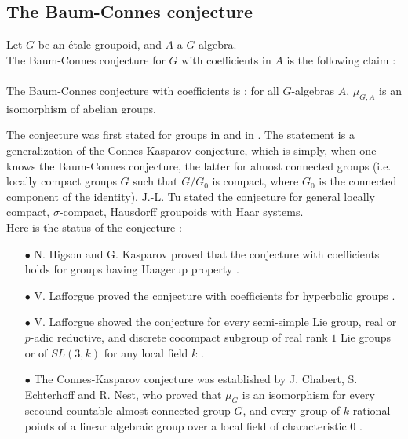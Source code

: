 
\subsection{The Baum-Connes conjecture}

\begin{conj}
Let $G$ be an étale groupoid, and $A$ a $G$-algebra.\\
The Baum-Connes conjecture for $G$ with coefficients in $A$ is the following claim : \\
\\
The Baum-Connes conjecture with coefficients is : for all $G$-algebras $A$, $\mu_{G,A}$ is an isomorphism of abelian groups.
\end{conj}

The conjecture was first stated for groups in \cite{BaumConnes} and in \cite{BaumConnesHigson}. The statement is a generalization of the Connes-Kasparov conjecture, which is simply, when one knows the Baum-Connes conjecture, the latter for almost connected groups (i.e. locally compact groups $G$ such that $G/G_0$ is compact, where $G_0$ is the connected component of the identity). J.-L. Tu stated the conjecture for general locally compact, $\sigma$-compact, Hausdorff groupoids with Haar systems.\cite{TuBC} \\

Here is the status of the conjecture :
\begin{itemize}
\item[$\bullet$] N. Higson and G. Kasparov proved that the conjecture with coefficients holds for groups having Haagerup property \cite{higsonkasparov}. 
\item[$\bullet$] V. Lafforgue proved the conjecture with coefficients for hyperbolic groups \cite{lafforgue2012conjecture}.
\item[$\bullet$] V. Lafforgue showed the conjecture for every semi-simple Lie group, real or $p$-adic reductive, and discrete cocompact subgroup of real rank $1$ Lie groups or of $SL(3,k)$ for any local field $k$ \cite{lafforgueT}. 
\item[$\bullet$] The Connes-Kasparov conjecture was established by J. Chabert, S. Echterhoff and R. Nest, who proved that $\mu_{G}$ is an isomorphism for every secound countable almost connected group $G$, and every group of $k$-rational points of a linear algebraic group over a local field of characteristic $0$ \cite{chabertEN}.\\
\end{itemize}

